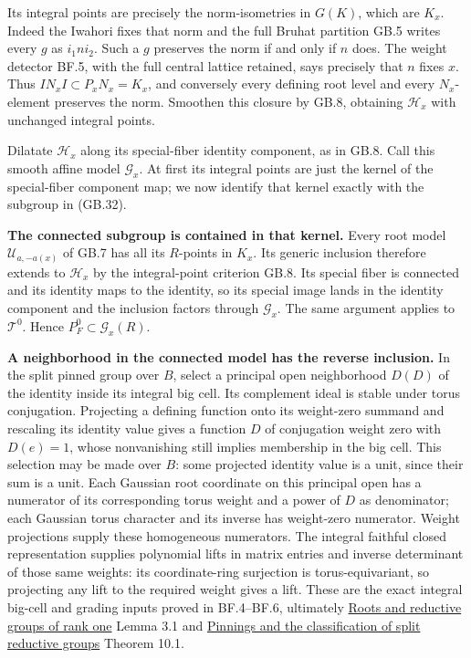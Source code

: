 \documentclass[
  11pt,
]{article}
\begin{document}
Its integral points are precisely the norm-isometries in \(G(K)\), which
are \(K_x\). Indeed the Iwahori fixes that norm and the full Bruhat
partition GB.5 writes every \(g\) as \(i_1ni_2\). Such a \(g\) preserves
the norm if and only if \(n\) does. The weight detector BF.5, with the
full central lattice retained, says precisely that \(n\) fixes \(x\).
Thus \(I N_x I\subset P_xN_x=K_x\), and conversely every defining root
level and every \(N_x\)-element preserves the norm. Smoothen this
closure by GB.8, obtaining \(\mathcal H_x\) with unchanged integral
points.

Dilatate \(\mathcal H_x\) along its special-fiber identity component, as
in GB.8. Call this smooth affine model \(\mathcal G_x\). At first its
integral points are just the kernel of the special-fiber component map;
we now identify that kernel exactly with the subgroup in (GB.32).

\textbf{The connected subgroup is contained in that kernel.} Every root
model \(\mathcal U_{a,-a(x)}\) of GB.7 has all its \(R\)-points in
\(K_x\). Its generic inclusion therefore extends to \(\mathcal H_x\) by
the integral-point criterion GB.8. Its special fiber is connected and
its identity maps to the identity, so its special image lands in the
identity component and the inclusion factors through \(\mathcal G_x\).
The same argument applies to \(\mathcal T^0\). Hence
\(P_F^0\subset\mathcal G_x(R)\).

\textbf{A neighborhood in the connected model has the reverse
inclusion.} In the split pinned group over \(B\), select a principal
open neighborhood \(D(D)\) of the identity inside its integral big cell.
Its complement ideal is stable under torus conjugation. Projecting a
defining function onto its weight-zero summand and rescaling its
identity value gives a function \(D\) of conjugation weight zero with
\(D(e)=1\), whose nonvanishing still implies membership in the big cell.
This selection may be made over \(B\): some projected identity value is
a unit, since their sum is a unit. Each Gaussian root coordinate on this
principal open has a numerator of its corresponding torus weight and a
power of \(D\) as denominator; each Gaussian torus character and its
inverse has weight-zero numerator. Weight projections supply these
homogeneous numerators. The integral faithful closed representation
supplies polynomial lifts in matrix entries and inverse determinant of
those same weights: its coordinate-ring surjection is torus-equivariant,
so projecting any lift to the required weight gives a lift. These are
the exact integral big-cell and grading inputs proved in BF.4--BF.6,
ultimately \href{../AG-RG/AG-RG-03.html}{Roots and reductive groups of
rank one} Lemma 3.1 and \href{../AG-RG/AG-RG-05.html}{Pinnings and the
classification of split reductive groups} Theorem 10.1.
\end{document}
